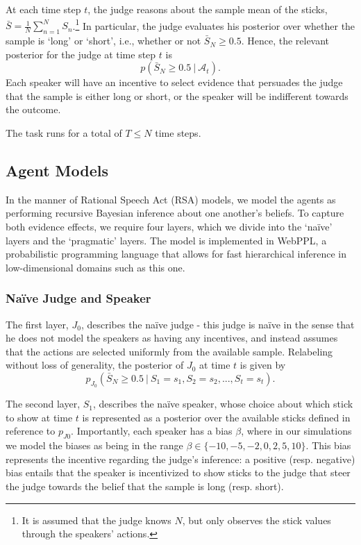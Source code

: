 \documentclass[10pt,letterpaper]{article}
\begin{document}
At each time step $t$, the judge reasons about the sample mean of the sticks, 
$\bar{S} = \frac{1}{N} \sum_{n=1}^N S_n$.\footnote{It is assumed that the judge knows $N$, but only observes the stick values through the speakers' actions.}
In particular, the judge evaluates his posterior over whether the sample is `long' or `short', i.e., whether or not
$\bar{S	}_N \ge 0.5$. Hence, the relevant posterior for the judge at time step $t$ is
\begin{equation}
p( \bar{S}_N \ge 0.5 \ | \ \mathcal{A}_t ).
\end{equation}
Each speaker will have an incentive to select evidence that persuades the judge that the sample is
either long or short, or the speaker will be indifferent towards the outcome.

The task runs for a total of $T\le N$ time steps.

\subsection{Agent Models}
In the manner of Rational Speech Act (RSA) models, we model the agents as performing
recursive Bayesian inference about one another's beliefs. To capture both evidence effects,
we require four layers, which we divide into the `na\"ive' layers and the `pragmatic' layers.
The model is implemented in WebPPL, a probabilistic programming language that allows for
fast hierarchical inference in low-dimensional domains such as this one.

\subsubsection{Na\"ive Judge and Speaker}
The first layer, $J_0$, describes the na\"ive judge - this judge is na\"ive in the sense that he
does not model the speakers as having any incentives, and instead assumes that the actions are selected
uniformly from the available sample. Relabeling without loss of generality, the posterior of $J_0$ at time $t$ is given by
\begin{equation}
p_{J_0}( \bar{S}_N \ge 0.5 \ | \ S_1=s_1, S_2=s_2, ..., S_t=s_t).
\end{equation}

The second layer, $S_1$, describes the na\"ive speaker, whose choice about which stick to show
at time $t$ is represented as a posterior over the available sticks defined in reference to $p_{J0}$.
Importantly, each speaker has a bias $\beta$, where in our simulations we model the biases as being
in the range $\beta \in \{-10, -5, -2, 0, 2, 5, 10\}.$ This bias represents the incentive regarding the judge's
inference: a positive (resp. negative) bias entails that the speaker is incentivized to show sticks to the judge
that steer the judge towards the belief that the sample is long (resp. short).
\end{document}
